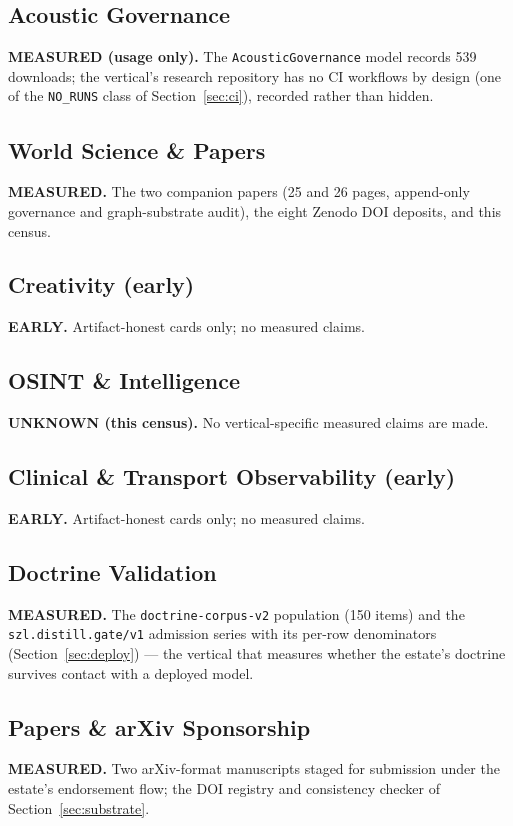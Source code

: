 ﻿\documentclass[11pt]{article}
\begin{document}
\subsection{Acoustic Governance}
\textbf{MEASURED (usage only).} The \texttt{AcousticGovernance} model records 539 downloads; the vertical's research repository has no CI workflows by design (one of the \texttt{NO\_RUNS} class of Section~\ref{sec:ci}), recorded rather than hidden.

\subsection{World Science \& Papers}
\textbf{MEASURED.} The two companion papers (25 and 26 pages, append-only governance and graph-substrate audit), the eight Zenodo DOI deposits, and this census.

\subsection{Creativity (early)}
\textbf{EARLY.} Artifact-honest cards only; no measured claims.

\subsection{OSINT \& Intelligence}
\textbf{UNKNOWN (this census).} No vertical-specific measured claims are made.

\subsection{Clinical \& Transport Observability (early)}
\textbf{EARLY.} Artifact-honest cards only; no measured claims.

\subsection{Doctrine Validation}
\textbf{MEASURED.} The \texttt{doctrine-corpus-v2} population (150 items) and the \texttt{szl.distill.gate/v1} admission series with its per-row denominators (Section~\ref{sec:deploy}) --- the vertical that measures whether the estate's doctrine survives contact with a deployed model.

\subsection{Papers \& arXiv Sponsorship}
\textbf{MEASURED.} Two arXiv-format manuscripts staged for submission under the estate's endorsement flow; the DOI registry and consistency checker of Section~\ref{sec:substrate}.
\end{document}
